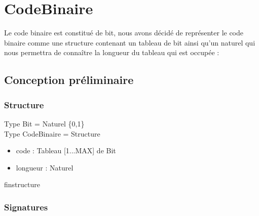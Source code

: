     \section*{CodeBinaire}

    Le code binaire est constitué de bit, nous avons décidé de représenter le code binaire comme une structure contenant un tableau de bit ainsi qu'un naturel qui nous permettra de connaître la longueur du tableau qui est occupée :

    \subsection*{Conception préliminaire}
    \subsubsection*{Structure}

	
    Type Bit = Naturel \{0,1\} \\
    Type CodeBinaire = Structure
	\begin{itemize}[label=$\ $, leftmargin=2cm]
	    \item code : Tableau [1...MAX] de Bit
	    \item longueur : Naturel
    \end{itemize}
	finstructure

    \subsubsection*{Signatures}

